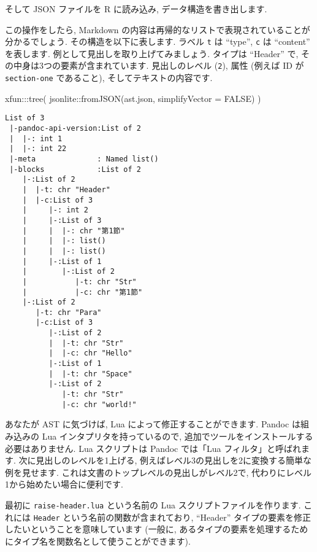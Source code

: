 \documentclass[
  11pt,
  lualatex,ja=standard,jafont=noto]{bxjsreport}
\newenvironment{Shaded}{\begin{snugshade}}{\end{snugshade}}
\newcommand{\AttributeTok}[1]{\textcolor[rgb]{0.77,0.63,0.00}{#1}}
\newcommand{\ConstantTok}[1]{\textcolor[rgb]{0.00,0.00,0.00}{#1}}
\newcommand{\FunctionTok}[1]{\textcolor[rgb]{0.00,0.00,0.00}{#1}}
\newcommand{\NormalTok}[1]{#1}
\newcommand{\SpecialCharTok}[1]{\textcolor[rgb]{0.00,0.00,0.00}{#1}}
\newcommand{\StringTok}[1]{\textcolor[rgb]{0.31,0.60,0.02}{#1}}
\begin{document}
そして JSON ファイルを R に読み込み, データ構造を書き出します.

この操作をしたら, Markdown の内容は再帰的なリストで表現されていることが分かるでしょう. その構造を以下に表します. ラベル \texttt{t} は ``type'', \texttt{c} は ``content'' を表します. 例として見出しを取り上げてみましょう. タイプは ``Header'' で, その中身は3つの要素が含まれています. 見出しのレベル (\texttt{2}), 属性 (例えば ID が \texttt{section-one} であること), そしてテキストの内容です.

\begin{Shaded}
\begin{Highlighting}[numbers=left,,]
\NormalTok{xfun}\SpecialCharTok{:::}\FunctionTok{tree}\NormalTok{(}
\NormalTok{  jsonlite}\SpecialCharTok{::}\FunctionTok{fromJSON}\NormalTok{(}\StringTok{\textquotesingle{}ast.json\textquotesingle{}}\NormalTok{, }\AttributeTok{simplifyVector =} \ConstantTok{FALSE}\NormalTok{)}
\NormalTok{)}
\end{Highlighting}
\end{Shaded}

\begin{verbatim}
List of 3
 |-pandoc-api-version:List of 2
 |  |-: int 1
 |  |-: int 22
 |-meta              : Named list()
 |-blocks            :List of 2
    |-:List of 2
    |  |-t: chr "Header"
    |  |-c:List of 3
    |     |-: int 2
    |     |-:List of 3
    |     |  |-: chr "第1節"
    |     |  |-: list()
    |     |  |-: list()
    |     |-:List of 1
    |        |-:List of 2
    |           |-t: chr "Str"
    |           |-c: chr "第1節"
    |-:List of 2
       |-t: chr "Para"
       |-c:List of 3
          |-:List of 2
          |  |-t: chr "Str"
          |  |-c: chr "Hello"
          |-:List of 1
          |  |-t: chr "Space"
          |-:List of 2
             |-t: chr "Str"
             |-c: chr "world!"
\end{verbatim}

あなたが AST に気づけば, Lua によって修正することができます. Pandoc は組み込みの Lua インタプリタを持っているので, 追加でツールをインストールする必要はありません. Lua スクリプトは Pandoc では「Lua フィルタ」と呼ばれます. 次に見出しのレベルを1上げる, 例えばレベル3の見出しを2に変換する簡単な例を見せます. これは文書のトップレベルの見出しがレベル2で, 代わりにレベル1から始めたい場合に便利です.

最初に \texttt{raise-header.lua} という名前の Lua スクリプトファイルを作ります. これには \texttt{Header} という名前の関数が含まれており, ``Header'' タイプの要素を修正したいということを意味しています (一般に, あるタイプの要素を処理するためにタイプ名を関数名として使うことができます).
\end{document}
